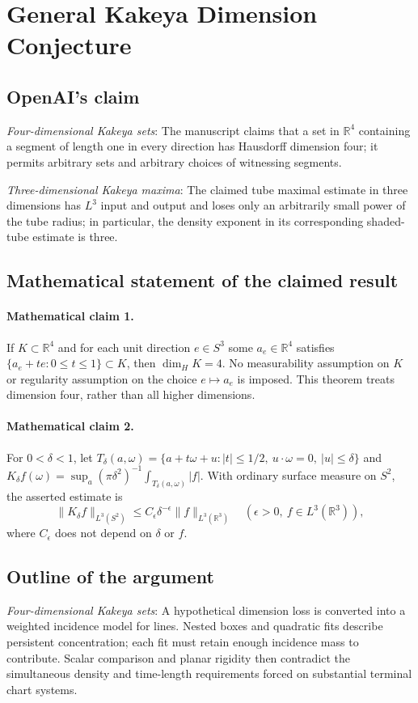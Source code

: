 \documentclass[11pt]{article}
\begin{document}
\section*{General Kakeya Dimension Conjecture}

\subsection{OpenAI's claim}
\textit{Four-dimensional Kakeya sets}: The manuscript claims that a set in $\mathbb R^4$ containing a segment of length one in every direction has Hausdorff dimension four; it permits arbitrary sets and arbitrary choices of witnessing segments.

\textit{Three-dimensional Kakeya maxima}: The claimed tube maximal estimate in three dimensions has $L^3$ input and output and loses only an arbitrarily small power of the tube radius; in particular, the density exponent in its corresponding shaded-tube estimate is three.

\subsection{Mathematical statement of the claimed result}
\paragraph{Mathematical claim 1.} If $K\subset\mathbb R^4$ and for each unit direction $e\in S^3$ some $a_e\in\mathbb R^4$ satisfies $\{a_e+te:0\le t\le1\}\subset K$, then $\dim_H K=4$. No measurability assumption on $K$ or regularity assumption on the choice $e\mapsto a_e$ is imposed. This theorem treats dimension four, rather than all higher dimensions.

\paragraph{Mathematical claim 2.} For $0<\delta<1$, let $T_\delta(a,\omega)=\{a+t\omega+u:|t|\le1/2,\ u\cdot\omega=0,\ |u|\le\delta\}$ and $K_\delta f(\omega)=\sup_a(\pi\delta^2)^{-1}\int_{T_\delta(a,\omega)}|f|$. With ordinary surface measure on $S^2$, the asserted estimate is \[\|K_\delta f\|_{L^3(S^2)}\le C_\epsilon\delta^{-\epsilon}\|f\|_{L^3(\mathbb R^3)}\quad(\epsilon>0,\ f\in L^3(\mathbb R^3)),\] where $C_\epsilon$ does not depend on $\delta$ or $f$.

\subsection{Outline of the argument}
\textit{Four-dimensional Kakeya sets}: A hypothetical dimension loss is converted into a weighted incidence model for lines. Nested boxes and quadratic fits describe persistent concentration; each fit must retain enough incidence mass to contribute. Scalar comparison and planar rigidity then contradict the simultaneous density and time-length requirements forced on substantial terminal chart systems.
\end{document}
